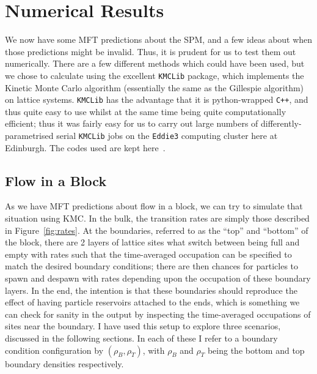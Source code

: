 \section{Numerical Results}
\label{sec:numRes}
We now have some MFT predictions about the SPM, and a few ideas about when those predictions might be invalid. Thus, it is prudent for us to test them out numerically.
There are a few different methods which could have been used, but we chose to calculate using the excellent \texttt{KMCLib}\cite{leetmaa2014kmclib} package, which implements the Kinetic Monte Carlo algorithm (essentially the same as the Gillespie algorithm)
on lattice systems. \texttt{KMCLib} has the advantage that it is python-wrapped \texttt{C++}, and thus quite easy to use whilst at the same time being quite computationally efficient; thus it was fairly easy for us to carry out large numbers
of differently-parametrised serial \texttt{KMCLib} jobs on the \texttt{Eddie3} computing cluster here at Edinburgh. The codes used are kept here~\cite{jHellGitRepo}.
\subsection{Flow in a Block}
As we have MFT predictions about flow in a block, we can try to simulate that situation using KMC. In the bulk, the transition rates are simply those described in Figure~\ref{fig:rates}. At the boundaries, referred to as the ``top''  and ``bottom''
of the block, there are 2 layers of lattice sites what switch between being full and empty with rates such that the time-averaged occupation can be specified to match the desired boundary conditions; there are then chances for particles to spawn
and despawn with rates depending upon the occupation of these boundary layers. In the end, the intention is that these boundaries should reproduce the effect of having particle reservoirs attached to the ends, which is something we can check for
sanity in the output by inspecting the time-averaged occupations of sites near the boundary. I have used this setup to explore three scenarios, discussed in the following sections. In each of these I refer to a boundary condition configuration
by $(\rho_B, \rho_T)$, with $\rho_B$ and $\rho_T$ being the bottom and top boundary densities respectively.

